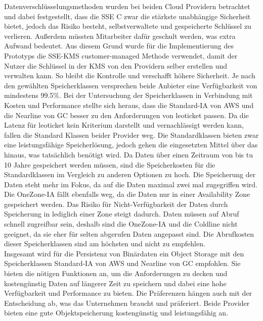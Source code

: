 Datenverschlüsselungsmethoden wurden bei beiden Cloud Providern betrachtet und dabei festgestellt, dass die SSE C zwar die stärkste unabhängige Sicherheit bietet, jedoch das Risiko besteht, selbstverwaltete und gespeicherte Schlüssel zu verlieren. Außerdem müssten Mitarbeiter dafür geschult werden, was extra Aufwand bedeutet. Aus diesem Grund wurde für die Implementierung des Prototyps die SSE-KMS customer-managed Methode verwendet, damit der Nutzer die Schlüssel in der KMS von den Providern selber erstellen und verwalten kann. So bleibt die Kontrolle und verschafft höhere Sicherheit. Je nach den gewählten Speicherklassen versprechen beide Anbieter eine Verfügbarkeit von mindestens 99.5\%. Bei der Untersuchung der Speicherklassen in Verbindung mit Kosten und Performance stellte sich heraus, dass die Standard-IA von AWS und die Nearline von GC besser zu den Anforderungen von leoticket passen. Da die Latenz für leoticket kein Kriterium darstellt und vernachlässigt werden kann, fallen die Standard Klassen beider Provider weg. Die Standardklassen bieten zwar eine leistungsfähige Speicherlösung, jedoch gehen die eingesetzten Mittel über das hinaus, was tatsächlich benötigt wird. Da Daten über einen Zeitraum von bis tu 10 Jahre gespeichert werden müssen, sind die Speicherkosten für die Standardklassen im Vergleich zu anderen Optionen zu hoch. Die Speicherung der Daten steht mehr im Fokus, da auf die Daten maximal zwei mal zugegriffen wird. Die OneZone-IA fällt ebenfalls weg, da die Daten nur in einer Availability Zone gespeichert werden. Das Risiko für Nicht-Verfügbarkeit der Daten durch Speicherung in lediglich einer Zone steigt dadurch. Daten müssen auf Abruf schnell zugreifbar sein, deshalb sind die OneZone-IA und die Coldline nicht geeignet, da sie eher für selten abgerufen Daten angepasst sind. Die Abrufkosten dieser Speicherklassen sind am höchsten und nicht zu empfehlen.\\

Insgesamt wird für die Persistenz von Binärdaten ein Object Storage mit den Speicherklassen Standard-IA von AWS und Nearline von GC empfohlen. Sie bieten die nötigen Funktionen an, um die Anforderungen zu decken und kostengünstig Daten auf längerer Zeit zu speichern und dabei eine hohe Verfügbarkeit und Performance zu bieten. Die Präferenzen hängen auch mit der Entscheidung ab, was das Unternehmen braucht und präferiert. Beide Provider bieten eine gute Objektspeicherung kostengünstig und leistungsfähig an.\\

